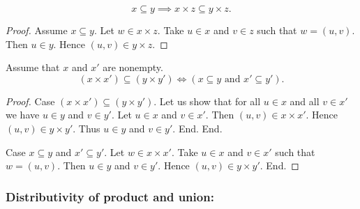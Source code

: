 \documentclass[../../set-theory.ftl.tex]{subfiles}
\begin{document}
  \begin{forthel}
    \begin{proposition}\label{SetTheory_01_06_197314}
      \[ x \subseteq y \implies x \times z \subseteq y \times z. \]
    \end{proposition}
    \begin{proof}
      Assume $x \subseteq y$.
      Let $w \in x \times z$.
      Take $u \in x$ and $v \in z$ such that $w = (u,v)$.
      Then $u \in y$.
      Hence $(u,v) \in y \times z$.
    \end{proof}

    \begin{proposition}\label{SetTheory_01_06_238807}
      Assume that $x$ and $x'$ are nonempty.
      \[ (x \times x') \subseteq (y \times y') \iff (\text{$x \subseteq y$ and $x' \subseteq y'$}). \]
    \end{proposition}
    \begin{proof}
      Case $(x \times x') \subseteq (y \times y')$.
        Let us show that for all $u \in x$ and all $v \in x'$ we have $u \in y$ and $v \in y'$.
          Let $u \in x$ and $v \in x'$.
          Then $(u,v) \in x \times x'$.
          Hence $(u,v) \in y \times y'$.
          Thus $u \in y$ and $v \in y'$.
        End.
      End.

      Case $x \subseteq y$ and $x' \subseteq y'$.
        Let $w \in x \times x'$.
        Take $u \in x$ and $v \in x'$ such that $w = (u,v)$.
        Then $u \in y$ and $v \in y'$.
        Hence $(u,v) \in y \times y'$.
      End.
    \end{proof}
  \end{forthel}


  \subsubsection*{Distributivity of product and union:}
\end{document}
